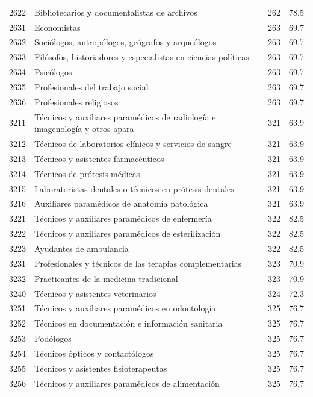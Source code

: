 \begin{longtable}{@{}c p{} c r@{}}
2622 & Bibliotecarios y documentalistas de archivos & 262 & 78.5 \\
2631 & Economistas & 263 & 69.7 \\
2632 & Sociólogos, antropólogos, geógrafos y arqueólogos & 263 & 69.7 \\
2633 & Filósofos, historiadores y especialistas en ciencias políticas & 263 & 69.7 \\
2634 & Psicólogos & 263 & 69.7 \\
2635 & Profesionales del trabajo social & 263 & 69.7 \\
2636 & Profesionales religiosos & 263 & 69.7 \\
3211 & Técnicos y auxiliares paramédicos de radiología e imagenología y otros apara & 321 & 63.9 \\
3212 & Técnicos de laboratorios clínicos y servicios de sangre & 321 & 63.9 \\
3213 & Técnicos y asistentes farmacéuticos & 321 & 63.9 \\
3214 & Técnicos de prótesis médicas & 321 & 63.9 \\
3215 & Laboratoristas dentales o técnicos en prótesis dentales & 321 & 63.9 \\
3216 & Auxiliares paramédicos de anatomía patológica & 321 & 63.9 \\
3221 & Técnicos y auxiliares paramédicos de enfermería & 322 & 82.5 \\
3222 & Técnicos y auxiliares paramédicos de esterilización & 322 & 82.5 \\
3223 & Ayudantes de ambulancia & 322 & 82.5 \\
3231 & Profesionales y técnicos de las terapias complementarias & 323 & 70.9 \\
3232 & Practicantes de la medicina tradicional & 323 & 70.9 \\
3240 & Técnicos y asistentes veterinarios & 324 & 72.3 \\
3251 & Técnicos y auxiliares paramédicos en odontología & 325 & 76.7 \\
3252 & Técnicos en documentación e información sanitaria & 325 & 76.7 \\
3253 & Podólogos & 325 & 76.7 \\
3254 & Técnicos ópticos y contactólogos & 325 & 76.7 \\
3255 & Técnicos y asistentes fisioterapeutas & 325 & 76.7 \\
3256 & Técnicos y auxiliares paramédicos de alimentación & 325 & 76.7 \\

\end{longtable}
